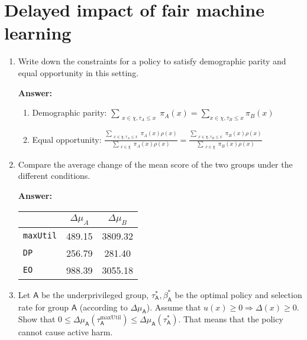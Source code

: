 \section{Delayed impact of fair machine learning}
\newcommand{\A}{\mathsf{A}}
\newcommand{\B}{\mathsf{B}}
\newcommand{\TPR}{\text{TPR}}
\newcommand{\maxUtil}{\texttt{maxUtil}}
\newcommand{\DemParity}{\texttt{DP}}
\newcommand{\EqOpp}{\texttt{EO}}
\begin{enumerate}
	\item  Write down the constraints for a policy to satisfy demographic parity and equal opportunity in this setting.
	
	\textbf{Answer:}
        \begin{enumerate}
            \item Demographic parity: 
            $ \sum\limits_{\substack{x \in \chi, \tau_A \leq x}} \pi_A(x) = \sum\limits_{x \in \chi, \tau_B \leq x} \pi_B(x) $

            \item Equal opportunity: $ \frac{\sum\limits_{\substack{x \in \chi, \tau_A \leq x}} \pi_A(x) \rho(x)}{\sum\limits_{\substack{x \in \chi}} \pi_A(x) \rho(x)} = \frac{\sum\limits_{\substack{x \in \chi, \tau_B \leq x}} \pi_B(x) \rho(x)}{\sum\limits_{\substack{x \in \chi}} \pi_B(x) \rho(x)} $
        \end{enumerate}
	
	
	\item Compare the average change of the mean score of the two groups under the
	different conditions.
	
	\textbf{Answer:}
	\begin{center}
		\begin{tabular}{l c c}
			\toprule
			& $\Delta\mu_A$ & $\Delta\mu_B$ \\
			\midrule 
			\maxUtil & 489.15 & 3809.32\\
			\DemParity & 256.79 & 281.40\\
			\EqOpp & 988.39 & 3055.18\\
			\bottomrule
		\end{tabular}
	\end{center}
	
	
	\item Let $\A$ be the underprivileged group, $\tau^*_\A, \beta^*_\A$ be the optimal policy and selection rate for group $\A$ (according to $\Delta\mu_\A$). Assume that $u(x)\geq 0 \Rightarrow \Delta(x) \geq0$. Show that $0 \leq \Delta\mu_\A(\tau^{\text{maxUtil}}_\A) \leq \Delta\mu_\A(\tau^*_\A)$. That means that the policy cannot cause active harm. 
	

\end{enumerate}
